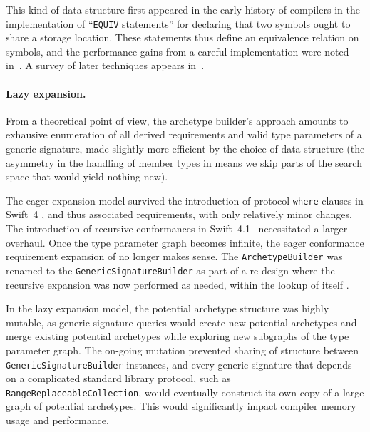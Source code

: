 \documentclass[../generics]{subfiles}
\begin{document}
This kind of data structure first appeared in the early history of compilers in the implementation of ``\texttt{EQUIV} statements'' for declaring that two symbols ought to share a storage location. These statements thus define an equivalence relation on symbols, and the performance gains from a careful implementation were noted in~\cite{improvedequivalence}. A survey of later techniques appears in~\cite{unionfindsurvey}.

\paragraph{Lazy expansion.}
From a theoretical point of view, the archetype builder's approach amounts to exhausive enumeration of all derived requirements and valid type parameters of a generic signature, made slightly more efficient by the choice of data structure (the asymmetry in the handling of member types in  means we skip parts of the search space that would yield nothing new).

The eager expansion model survived the introduction of protocol \texttt{where} clauses in Swift~4 \cite{se0142}, and thus associated requirements, with only relatively minor changes. The introduction of recursive conformances in Swift~4.1~\cite{se0157} necessitated a larger overhaul. Once the type parameter graph becomes infinite, the eager conformance requirement expansion of  no longer makes sense. The \texttt{ArchetypeBuilder} was renamed to the \texttt{GenericSignatureBuilder} as part of a re-design where the recursive expansion was now performed as needed, within the lookup of  itself \cite{implrecursive}.

In the lazy expansion model, the potential archetype structure was highly mutable, as generic signature queries would create new potential archetypes and merge existing potential archetypes while exploring new subgraphs of the type parameter graph. The on-going mutation prevented sharing of structure between \texttt{GenericSignatureBuilder} instances, and every generic signature that depends on a complicated standard library protocol, such as \texttt{RangeReplaceableCollection}, would eventually construct its own copy of a large graph of potential archetypes. This would significantly impact compiler memory usage and performance.
\end{document}
